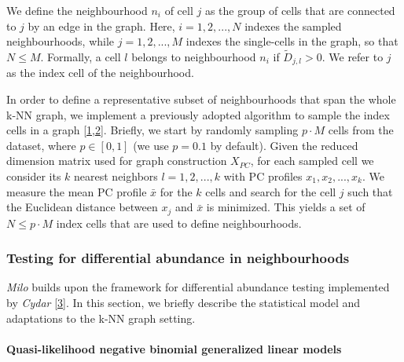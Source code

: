 \documentclass[
]{article}
\begin{document}
We define the neighbourhood \(n_i\) of cell \(j\) as the group of cells that are connected to \(j\) by an edge in the graph. Here, \(i=1,2,...,N\) indexes the sampled neighbourhoods, while \(j=1,2,...,M\) indexes the single-cells in the graph, so that \(N \leq M\).
Formally, a cell \(l\) belongs to neighbourhood \(n_i\) if \(\tilde{D}_{j,l} > 0\). We refer to \(j\) as the index cell of the neighbourhood.

In order to define a representative subset of neighbourhoods that span the whole k-NN graph, we implement a previously adopted algorithm to sample the index cells in a graph {[}\protect\hyperlink{ref-gutTrajectoriesCellcycleProgression2015}{1},\protect\hyperlink{ref-settyWishboneIdentifiesBifurcating2016}{2}{]}.
Briefly, we start by randomly sampling \(p \cdot M\) cells from the dataset, where \(p \in [0,1]\) (we use \(p = 0.1\) by default).
Given the reduced dimension matrix used for graph construction \(X_{PC}\), for each sampled cell we consider its \(k\) nearest neighbors \(l = 1,2,...,k\) with PC profiles \({x_1, x_2, ... , x_k}\). We measure the mean PC profile \(\bar{x}\) for the \(k\) cells and search for the cell \(j\) such that the Euclidean distance between \(x_j\) and \(\bar{x}\) is minimized. This yields a set of \(N \leq p \cdot M\) index cells that are used to define neighbourhoods.

\hypertarget{testing-for-differential-abundance-in-neighbourhoods}{%
\subsubsection{Testing for differential abundance in neighbourhoods}\label{testing-for-differential-abundance-in-neighbourhoods}}

\emph{Milo} builds upon the framework for differential abundance testing implemented by \emph{Cydar} {[}\protect\hyperlink{ref-lunTestingDifferentialAbundance2017}{3}{]}. In this section, we briefly describe the statistical model and adaptations to the k-NN graph setting.

\hypertarget{quasi-likelihood-negative-binomial-generalized-linear-models}{%
\paragraph*{Quasi-likelihood negative binomial generalized linear models}\label{quasi-likelihood-negative-binomial-generalized-linear-models}}
\end{document}
